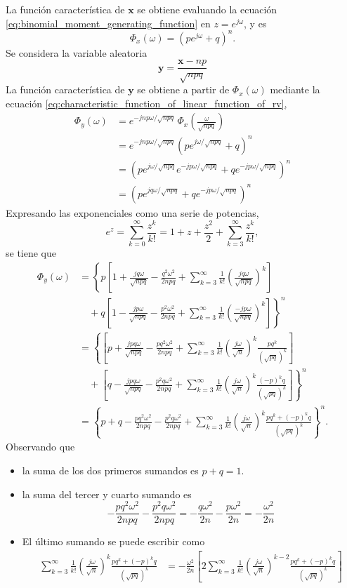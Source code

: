 \documentclass[a4paper]{report}
\newcommand{\x}{\mathbf{x}}
\newcommand{\y}{\mathbf{y}}
\begin{document}
La función característica de \(\x\) se obtiene evaluando la ecuación \ref{eq:binomial_moment_generating_function} en \(z=e^{j\omega}\), y es
\[
 \Phi_x(\omega)=\left(pe^{j\omega}+q\right)^n.
\]
Se considera la variable aleatoria
\[
 \y=\frac{\x-np}{\sqrt{npq}}
\]
La función característica de \(\y\) se obtiene a partir de \(\Phi_x(\omega)\) mediante la ecuación \ref{eq:characteristic_function_of_linear_function_of_rv},
\begin{align*}
 \Phi_y(\omega)&=e^{-jnp\omega/\sqrt{npq}}\,\Phi_x\left(\frac{\omega}{\sqrt{npq}}\right)\\
   &=e^{-jnp\omega/\sqrt{npq}}\left(pe^{j\omega/\sqrt{npq}}+q\right)^n\\
   &=\left(pe^{j\omega/\sqrt{npq}}e^{-jp\omega/\sqrt{npq}}+qe^{-jp\omega/\sqrt{npq}}\right)^n\\
   &=\left(pe^{jq\omega/\sqrt{npq}}+qe^{-jp\omega/\sqrt{npq}}\right)^n
\end{align*}
Expresando las exponenciales como una serie de potencias, 
\[
 e^z=\sum_{k=0}^{\infty}\frac{z^{k}}{k!}=1+z+\frac{z^2}{2}+\sum_{k=3}^{\infty}\frac{z^{k}}{k!},
\]
se tiene que
\begin{align*}
 \Phi_y(\omega)&=\left\{p\left[1+\frac{jq\omega}{\sqrt{npq}}-\frac{q^2\omega^2}{2npq}+\sum_{k=3}^{\infty }\frac{1}{k!}\left(\frac{jq\omega}{\sqrt{npq}}\right)^k\right]\right.\\
   &\quad+\left. q\left[1-\frac{jp\omega}{\sqrt{npq}}-\frac{p^2\omega^2}{2npq}+\sum_{k=3}^{\infty }\frac{1}{k!}\left(\frac{-jp\omega}{\sqrt{npq}}\right)^k\right]\right\}^n\\
 &=\left\{\left[p+\frac{jpq\omega}{\sqrt{npq}}-\frac{pq^2\omega^2}{2npq}
  +\sum_{k=3}^{\infty }\frac{1}{k!}\left(\frac{j\omega}{\sqrt{n}}\right)^k\frac{pq^k}{\left(\sqrt{pq}\right)^k}\right]\right.\\
   &\quad+\left. \left[q-\frac{jpq\omega}{\sqrt{npq}}-\frac{p^2q\omega^2}{2npq} 
  +\sum_{k=3}^{\infty }\frac{1}{k!}\left(\frac{j\omega}{\sqrt{n}}\right)^k\frac{(-p)^kq}{\left(\sqrt{pq}\right)^k}\right]\right\}^n\\
 &=\left\{p+q-\frac{pq^2\omega^2}{2npq}-\frac{p^2q\omega^2}{2npq}
  +\sum_{k=3}^{\infty }\frac{1}{k!}\left(\frac{j\omega}{\sqrt{n}}\right)^k
  \frac{pq^k+(-p)^kq}{\left(\sqrt{pq}\right)^k}\right\}^n.
\end{align*}
Observando que
\begin{itemize}
 \item la suma de los dos primeros sumandos es \(p+q=1\).
 \item la suma del tercer y cuarto sumando es
 \[
  -\frac{pq^2\omega^2}{2npq}-\frac{p^2q\omega^2}{2npq}=-\frac{q\omega^2}{2n}-\frac{p\omega^2}{2n}=-\frac{\omega^2}{2n}
 \]
 \item El último sumando se puede escribir como
 \begin{align*}
  \sum_{k=3}^{\infty}\frac{1}{k!}\left(\frac{j\omega}{\sqrt{n}}\right)^k
  \frac{pq^k+(-p)^kq}{\left(\sqrt{pq}\right)^k}
   &=-\frac{\omega^2}{2n}\left[2\sum_{k=3}^{\infty}\frac{1}{k!}\left(\frac{j\omega}{\sqrt{n}}\right)^{k-2}
  \frac{pq^k+(-p)^kq}{\left(\sqrt{pq}\right)^k}\right]
 \end{align*}
\end{itemize}
\end{document}
